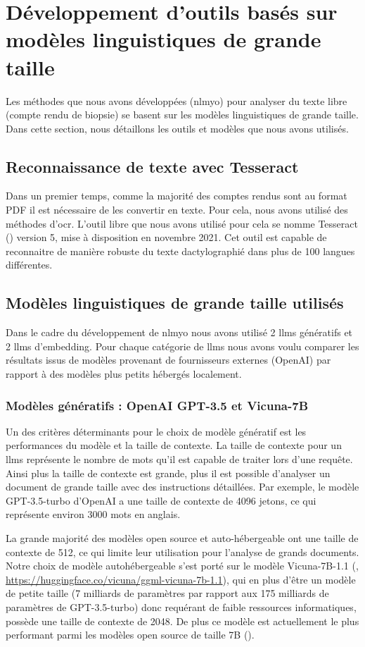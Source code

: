 \section{Développement d'outils basés sur modèles linguistiques de grande taille}
Les méthodes que nous avons développées (\gls{nlmyo}) pour analyser du texte libre (compte rendu de biopsie) se basent sur les modèles linguistiques de grande taille. Dans cette section, nous détaillons les outils et modèles que nous avons utilisés.

\subsection{Reconnaissance de texte avec Tesseract}
Dans un premier temps, comme la majorité des comptes rendus sont au format PDF il est nécessaire de les convertir en texte. Pour cela, nous avons utilisé des méthodes d'\gls{ocr}. L'outil libre que nous avons utilisé pour cela se nomme Tesseract (\cite{ray_tesseract_2015}) version 5, mise à disposition en novembre 2021. Cet outil est capable de reconnaitre de manière robuste du texte dactylographié dans plus de 100 langues différentes.

\subsection{Modèles linguistiques de grande taille utilisés}
Dans le cadre du développement de \gls{nlmyo} nous avons utilisé 2 \gls{llms} génératifs et 2 \gls{llms} d'embedding. Pour chaque catégorie de \gls{llms} nous avons voulu comparer les résultats issus de modèles provenant de fournisseurs externes (OpenAI) par rapport à des modèles plus petits hébergés localement.

\subsubsection{Modèles génératifs : OpenAI GPT-3.5 et Vicuna-7B}
Un des critères déterminants pour le choix de modèle génératif est les performances du modèle et la taille de contexte. La taille de contexte pour un \gls{llms} représente le nombre de mots qu'il est capable de traiter lors d'une requête. Ainsi plus la taille de contexte est grande, plus il est possible d'analyser un document de grande taille avec des instructions détaillées. Par exemple, le modèle GPT-3.5-turbo d'OpenAI a une taille de contexte de 4096 jetons, ce qui représente environ 3000 mots en anglais. 

La grande majorité des modèles open source et auto-hébergeable ont une taille de contexte de 512, ce qui limite leur utilisation pour l'analyse de grands documents. Notre choix de modèle autohébergeable s'est porté sur le modèle Vicuna-7B-1.1 (\cite{chiang_vicuna_2023}, \url{https://huggingface.co/vicuna/ggml-vicuna-7b-1.1}), qui en plus d'être un modèle de petite taille (7 milliards de paramètres par rapport aux 175 milliards de paramètres de GPT-3.5-turbo) donc requérant de faible ressources informatiques, possède une taille de contexte de 2048. De plus ce modèle est actuellement le plus  performant parmi les modèles open source de taille 7B (\cite{hendrycks_measuring_2021}). 

